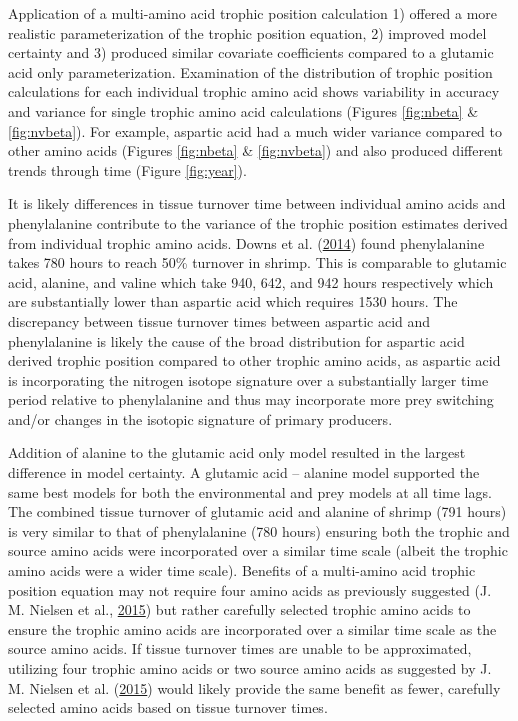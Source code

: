 \documentclass [11pt, proquest] {uwthesis}[2015/03/03]
\begin{document}
Application of a multi-amino acid trophic position calculation 1)
offered a more realistic parameterization of the trophic position
equation, 2) improved model certainty and 3) produced similar covariate
coefficients compared to a glutamic acid only parameterization.
Examination of the distribution of trophic position calculations for
each individual trophic amino acid shows variability in accuracy and
variance for single trophic amino acid calculations (Figures
\ref{fig:nbeta} \& \ref{fig:nvbeta}). For example, aspartic acid had a
much wider variance compared to other amino acids (Figures
\ref{fig:nbeta} \& \ref{fig:nvbeta}) and also produced different trends
through time (Figure \ref{fig:year}).

It is likely differences in tissue turnover time between individual
amino acids and phenylalanine contribute to the variance of the trophic
position estimates derived from individual trophic amino acids. Downs et
al. (\protect\hyperlink{ref-Downs2014}{2014}) found phenylalanine takes
780 hours to reach 50\% turnover in shrimp. This is comparable to
glutamic acid, alanine, and valine which take 940, 642, and 942 hours
respectively which are substantially lower than aspartic acid which
requires 1530 hours. The discrepancy between tissue turnover times
between aspartic acid and phenylalanine is likely the cause of the broad
distribution for aspartic acid derived trophic position compared to
other trophic amino acids, as aspartic acid is incorporating the
nitrogen isotope signature over a substantially larger time period
relative to phenylalanine and thus may incorporate more prey switching
and/or changes in the isotopic signature of primary producers.

Addition of alanine to the glutamic acid only model resulted in the
largest difference in model certainty. A glutamic acid -- alanine model
supported the same best models for both the environmental and prey
models at all time lags. The combined tissue turnover of glutamic acid
and alanine of shrimp (791 hours) is very similar to that of
phenylalanine (780 hours) ensuring both the trophic and source amino
acids were incorporated over a similar time scale (albeit the trophic
amino acids were a wider time scale). Benefits of a multi-amino acid
trophic position equation may not require four amino acids as previously
suggested (J. M. Nielsen et al.,
\protect\hyperlink{ref-Nielsen2015}{2015}) but rather carefully selected
trophic amino acids to ensure the trophic amino acids are incorporated
over a similar time scale as the source amino acids. If tissue turnover
times are unable to be approximated, utilizing four trophic amino acids
or two source amino acids as suggested by J. M. Nielsen et al.
(\protect\hyperlink{ref-Nielsen2015}{2015}) would likely provide the
same benefit as fewer, carefully selected amino acids based on tissue
turnover times.
\end{document}
